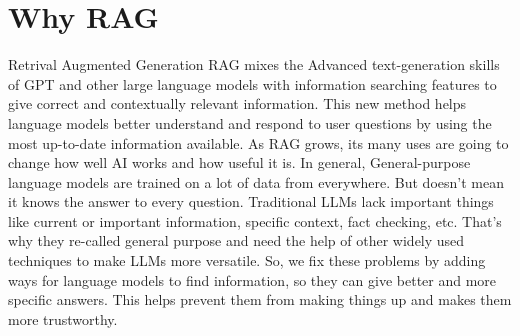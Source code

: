\section{Why RAG}
Retrival Augmented Generation RAG mixes the Advanced text-generation skills of GPT and other large language models with information searching features to give correct and contextually relevant information. This new method helps language models better understand and respond to user questions by using the most up-to-date information available. As RAG grows, its many uses are going to change how well AI works and how useful it is.
\vskip 0.5cm
In general, General-purpose language models are trained on a lot of data from everywhere. But doesn't mean it knows the answer to every question. Traditional LLMs lack important things like current or important information, specific context, fact checking, etc. That's why they re-called general purpose and need the help of other widely used techniques to make LLMs more versatile.
So, we fix these problems by adding ways for language models to find information, so they can give better and more specific answers. This helps prevent them from making things up and makes them more trustworthy.

